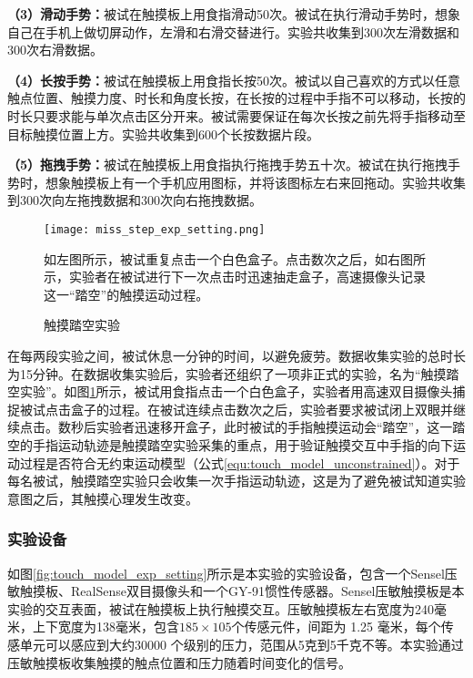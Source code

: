 \textbf{（3）滑动手势：}被试在触摸板上用食指滑动50次。被试在执行滑动手势时，想象自己在手机上做切屏动作，左滑和右滑交替进行。实验共收集到300次左滑数据和300次右滑数据。

\textbf{（4）长按手势：}被试在触摸板上用食指长按50次。被试以自己喜欢的方式以任意触点位置、触摸力度、时长和角度长按，在长按的过程中手指不可以移动，长按的时长只要求能与单次点击区分开来。被试需要保证在每次长按之前先将手指移动至目标触摸位置上方。实验共收集到600个长按数据片段。

\textbf{（5）拖拽手势：}被试在触摸板上用食指执行拖拽手势五十次。被试在执行拖拽手势时，想象触摸板上有一个手机应用图标，并将该图标左右来回拖动。实验共收集到300次向左拖拽数据和300次向右拖拽数据。

\begin{figure}
	\centering
	\texttt{[image: miss\_step\_exp\_setting.png]}
	\caption*{如左图所示，被试重复点击一个白色盒子。点击数次之后，如右图所示，实验者在被试进行下一次点击时迅速抽走盒子，高速摄像头记录这一“踏空”的触摸运动过程。}
	\caption{触摸踏空实验}
	\label{fig:miss_step_exp_setting}
\end{figure}

在每两段实验之间，被试休息一分钟的时间，以避免疲劳。数据收集实验的总时长为15分钟。在数据收集实验后，实验者还组织了一项非正式的实验，名为“触摸踏空实验”。如图\ref{fig:miss_step_exp_setting}所示，被试用食指点击一个白色盒子，实验者用高速双目摄像头捕捉被试点击盒子的过程。在被试连续点击数次之后，实验者要求被试闭上双眼并继续点击。数秒后实验者迅速移开盒子，此时被试的手指触摸运动会“踏空”，这一踏空的手指运动轨迹是触摸踏空实验采集的重点，用于验证触摸交互中手指的向下运动过程是否符合无约束运动模型（公式\ref{equ:touch_model_unconstrained}）。对于每名被试，触摸踏空实验只会收集一次手指运动轨迹，这是为了避免被试知道实验意图之后，其触摸心理发生改变。

\subsubsection{实验设备}

如图\ref{fig:touch_model_exp_setting}所示是本实验的实验设备，包含一个Sensel压敏触摸板\cite{Website-Morph}、RealSense双目摄像头\cite{keselman2017intel}和一个GY-91惯性传感器。Sensel压敏触摸板是本实验的交互表面，被试在触摸板上执行触摸交互。压敏触摸板左右宽度为240毫米，上下宽度为138毫米，包含$185×105$个传感元件，间距为 1.25 毫米，每个传感单元可以感应到大约30000 个级别的压力，范围从5克到5千克不等。本实验通过压敏触摸板收集触摸的触点位置和压力随着时间变化的信号。

